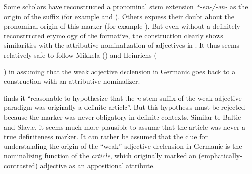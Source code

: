 Some scholars have reconstructed a pronominal stem extension \textit{*-en-/-on-} as the origin of the suffix (for example \citealt[52]{mikkola1950} and \citealt[67]{heinrichs1954}). Others express their doubt about the pronominal origin of this marker (for example \citealt[21 Footnote 6]{schmidt1959}). But even without a definitely reconstructed etymology of the formative, the construction clearly shows similarities with the attributive nominalization of adjectives in . It thus seems relatively safe to follow Mikkola (\citeyear{mikkola1950}) and Heinrichs ({\citeyear{heinrichs1954}) in assuming that the weak adjective declension in Germanic goes back to a construction with an attributive nominalizer.

\citet[170]{ringe2006} finds it “reasonable to hypothesize that the \textit{n-}stem suffix of the weak adjective paradigm was originally a definite article”. But this hypothesis must be rejected because the marker was never obligatory in definite contexts. Similar to Baltic and Slavic, it seems much more plausible to assume that the article was never a true definiteness marker. It can rather be assumed that the clue for understanding the origin of the “weak” adjective declension in Germanic is the nominalizing function of the \textit{article}, which originally marked an (emphatically-contrasted) adjective as an appositional attribute.

}
